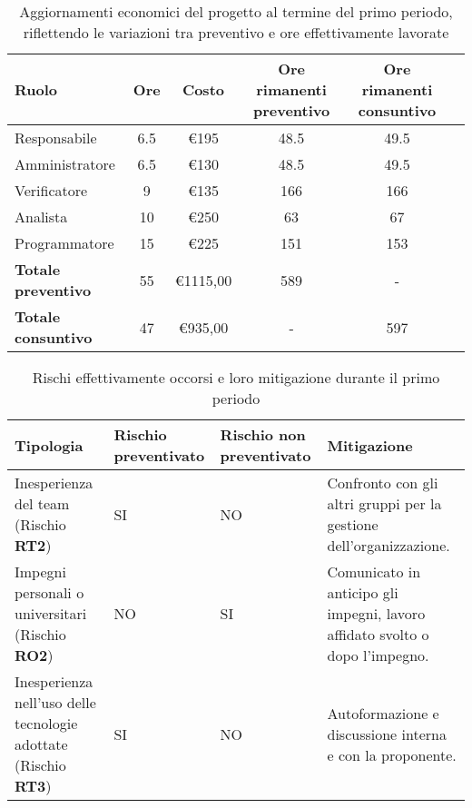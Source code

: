         \begin{table}[!h]
            \centering
            \begin{tabular}{|l| c| c| c| c| c| } 
                \hline
                \textbf{Ruolo} & \textbf{Ore} & \textbf{Costo} & \textbf{Ore rimanenti preventivo} & \textbf{Ore rimanenti consuntivo} \\
                \hline  
                 Responsabile        & 6.5 & €195 & 48.5 & 49.5 \\ 
                 Amministratore      & 6.5 & €130 & 48.5 & 49.5 \\ 
                 Verificatore        & 9   & €135 & 166  & 166 \\ 
                 Analista            & 10  & €250 & 63   & 67 \\ 
                 Programmatore       & 15  & €225 & 151  & 153 \\ 
                \hline
                \textbf{Totale preventivo} & 55 & €1115,00 & 589 & - \\
                \hline
                \textbf{Totale consuntivo} & 47 & €935,00 & - & 597 \\
                \hline
            \end{tabular}
            \caption{Aggiornamenti economici del progetto al termine del primo periodo, riflettendo le variazioni tra preventivo e ore effettivamente lavorate}
            \label{tab:3}
        \end{table}
        \begin{table}[!h]
            \centering
            \begin{tabular}{|p{4cm}| p{4cm}| p{4cm}| p{4cm}|} 
                \hline
                \textbf{Tipologia} & \textbf{Rischio preventivato} & \textbf{Rischio non preventivato} & \textbf{Mitigazione}  \\
                \hline  
                Inesperienza del team (Rischio \textbf{RT2}) & SI & NO & Confronto con gli altri gruppi per la gestione dell'organizzazione.\\
                \hline %
                Impegni personali o universitari (Rischio \textbf{RO2})& NO & SI & Comunicato in anticipo gli impegni, lavoro affidato svolto o dopo l'impegno.\\
                \hline
                Inesperienza nell'uso delle tecnologie adottate (Rischio \textbf{RT3}) & SI & NO & Autoformazione e discussione interna e con la proponente.\\
                \hline
            \end{tabular}
            \caption{Rischi effettivamente occorsi e loro mitigazione durante il primo periodo}
            \label{tab:4}
        \end{table}

